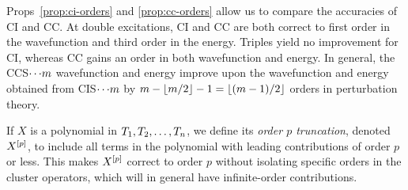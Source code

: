 \documentclass[11pt]{article}
\numberwithin{equation}{section}
\begin{document}
\begin{ex}
Props~\ref{prop:ci-orders} and \ref{prop:cc-orders} allow us to compare the accuracies of CI and CC.
At double excitations, CI and CC are both correct to first order in the wavefunction and third order in the energy.
Triples yield no improvement for CI, whereas CC gains an order in both wavefunction and energy.
In general, the CCS${\cdots}m$ wavefunction and energy improve upon the wavefunction and energy obtained from
CIS${\cdots}m$ by
$
  m
-
  \left\lfloor m/2\right\rfloor
-
  1
=
  \left\lfloor(m-1)/2\right\rfloor
$
orders in perturbation theory.
\end{ex}

\begin{dfn}
If $X$ is a polynomial in $T_1,T_2,\ldots,T_n$, we define
its \textit{order $p$ truncation}, denoted $X^{[p]}$,
to include all terms in the polynomial with leading contributions of order $p$ or less.
This makes $X^{[p]}$ correct to order $p$ without isolating specific orders in the cluster operators, which will in general have infinite-order contributions.
\end{dfn}
\end{document}
